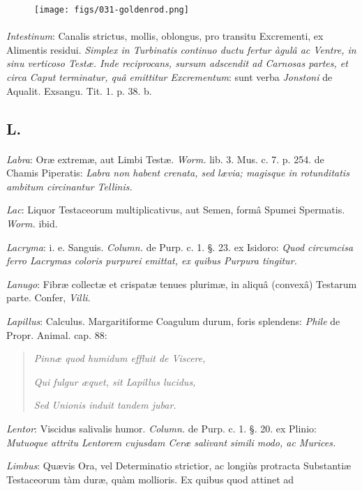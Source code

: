 \documentclass[a4paper, 11pt, oneside, polutonikogreek, german]{article}
\begin{document}
\begin{figure}[H]
\centering
\texttt{[image: figs/031-goldenrod.png]}
\end{figure}
\paragraph{}
\emph{Intestinum}: Canalis strictus, mollis, oblongus, pro transitu Excrementi, ex Alimentis residui. \emph{Simplex in Turbinatis continuo ductu fertur àgulâ ac Ventre, in sinu verticoso Testæ. Inde reciprocans, sursum adscendit ad Carnosas partes, et circa Caput terminatur, quâ emittitur Excrementum}: sunt verba \emph{Jonstoni} de Aqualit. Exsangu. Tit. 1. p. 38. b.

\subsection{L.}
\paragraph{}
\emph{Labra}: Oræ extremæ, aut Limbi Testæ. \emph{Worm.} lib. 3. Mus. c. 7. p. 254. de Chamis Piperatis: \emph{Labra non habent crenata, sed lævia; magisque in rotunditatis ambitum circinantur Tellinis.}

\emph{Lac}: Liquor Testaceorum multiplicativus, aut Semen, formâ Spumei Spermatis. \emph{Worm.} ibid.

\emph{Lacryma}: i. e. Sanguis. \emph{Column.} de Purp. c. 1. §. 23. ex Isidoro: \emph{Quod circumcisa ferro Lacrymas coloris purpurei emittat, ex quibus Purpura tingitur.}

\emph{Lanugo}: Fibræ collectæ et crispatæ tenues plurimæ, in aliquâ (convexâ) Testarum parte. Confer, \emph{Villi}.

\emph{Lapillus}: Calculus. Margaritiforme Coagulum durum, foris splendens: \emph{Phile} de Propr. Animal. cap. 88:
\begin{quotation}
\emph{Pinnæ quod humidum effluit de Viscere,}

\emph{Qui fulgur æquet, sit Lapillus lucidus,}

\emph{Sed Unionis induit tandem jubar.}
\end{quotation}
\emph{Lentor}: Viscidus salivalis humor. \emph{Column.} de Purp. c. 1. §. 20. ex Plinio: \emph{Mutuoque attritu Lentorem cujusdam Ceræ salivant simili modo, ac Murices.}

\emph{Limbus}: Quævis Ora, vel Determinatio strictior, ac longiùs protracta Substantiæ Testaceorum tàm duræ, quàm mollioris. Ex quibus quod attinet ad
\end{document}

